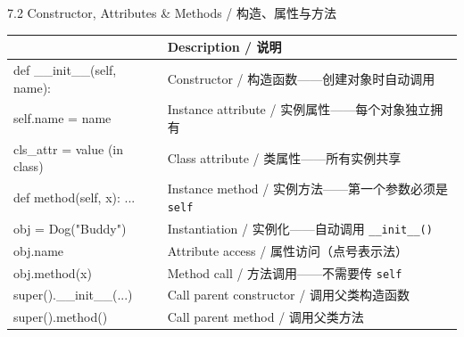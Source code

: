 \documentclass[11pt,a4paper]{report}
\let\oldtexttt\texttt
\renewcommand{\texttt}[1]{\textcolor{mainblue}{\oldtexttt{#1}}}
\begin{document}
\begin{cmdsection}{7.2  Constructor, Attributes \& Methods / 构造、属性与方法}
\normalsize\renewcommand{\arraystretch}{1.4}
\centering
\begin{tabularx}{\textwidth}{@{}>{\ttfamily}l>{\raggedright\arraybackslash}X@{}}
\toprule
\multicolumn{1}{@{}l}{\textbf{Syntax}} & \textbf{Description / 说明} \\ \midrule
def \_\_init\_\_(self, name): & Constructor / 构造函数——创建对象时自动调用 \\
self.name = name            & Instance attribute / 实例属性——每个对象独立拥有 \\
cls\_attr = value (in class) & Class attribute / 类属性——所有实例共享 \\
def method(self, x): ...    & Instance method / 实例方法——第一个参数必须是 \texttt{self} \\
obj = Dog("Buddy")          & Instantiation / 实例化——自动调用 \texttt{\_\_init\_\_()} \\
obj.name                    & Attribute access / 属性访问（点号表示法） \\
obj.method(x)               & Method call / 方法调用——不需要传 \texttt{self} \\
super().\_\_init\_\_(...)     & Call parent constructor / 调用父类构造函数 \\
super().method()            & Call parent method / 调用父类方法 \\
\bottomrule
\end{tabularx}
\end{cmdsection}
\end{document}
